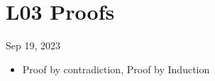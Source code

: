 \section{L03 Proofs}
Sep 19, 2023
\begin{itemize}
	\item Proof by contradiction, Proof by Induction
\end{itemize}
